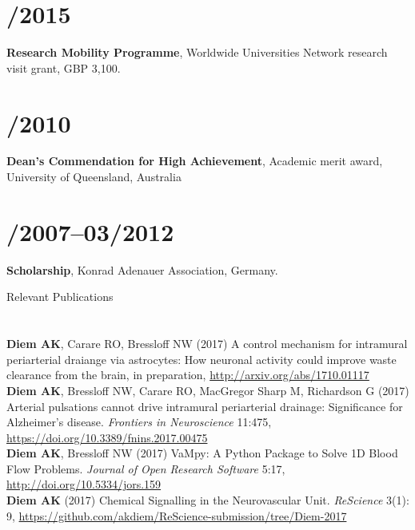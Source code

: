 \documentclass[margin,line,10pt]{res}
\begin{document}
\begin{resume}
\section{/2015}{\bf Research Mobility Programme}, Worldwide Universities Network research visit grant, GBP 3,100.\\        
\vspace*{-.35in}
\section{/2010}{\bf Dean's Commendation for High Achievement}, Academic merit award, University of Queensland, Australia\\
\vspace*{-.35in}
\section{/2007--03/2012}{\bf Scholarship}, Konrad Adenauer Association, Germany.\\        

\vspace*{-.2in}

{\sc Relevant Publications}\\
\vspace*{-.35in}
\section{}

{\bf Diem AK}, Carare RO, Bressloff NW (2017) A control mechanism for intramural periarterial draiange via astrocytes: How neuronal activity could improve waste clearance from the brain, in preparation, \url{http://arxiv.org/abs/1710.01117}\\
{\bf Diem AK}, Bressloff NW, Carare RO, MacGregor Sharp M, Richardson G (2017) Arterial pulsations cannot drive intramural periarterial drainage: Significance for Alzheimer's disease. \textit{Frontiers in Neuroscience} 11:475, \url{https://doi.org/10.3389/fnins.2017.00475}\\
{\bf Diem AK}, Bressloff NW (2017) VaMpy: A Python Package to Solve 1D Blood Flow Problems. {\em Journal of Open Research Software} 5:17, \url{http://doi.org/10.5334/jors.159}\\
{\bf Diem AK} (2017) Chemical Signalling in the Neurovascular Unit. \textit{ReScience} 3(1): 9, \url{https://github.com/akdiem/ReScience-submission/tree/Diem-2017}\\
\vspace*{-.35in}

\end{resume}
\end{document}
